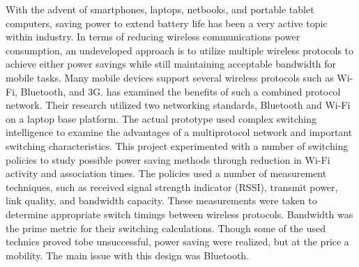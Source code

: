 \documentclass[conference]{IEEEtran}
\begin{document}
With the advent of smartphones, laptops, netbooks, and portable tablet computers, saving power to extend battery life has been a very active topic within industry. In terms of reducing wireless communications power consumption, an undeveloped approach is to utilize multiple wireless protocols to achieve either power savings while still maintaining acceptable bandwidth for mobile tasks.  Many mobile devices support several wireless protocols such as Wi-Fi, Bluetooth, and 3G.  \cite{six} has examined the benefits of such a combined protocol network.  Their research utilized two networking standards, Bluetooth and Wi-Fi on a laptop base platform.  The actual prototype used complex switching intelligence to examine the advantages of a multiprotocol network and important switching characteristics.  This project experimented with a number of switching policies to study possible power saving methods through reduction in Wi-Fi activity and association times.  The policies used a number of measurement techniques, such as received signal strength indicator (RSSI), transmit power, link quality, and bandwidth capacity.  These measurements were taken to determine appropriate switch timings between wireless protocols\cite{six}.  Bandwidth was the prime metric for their switching calculations.  Though some of the used technics proved tobe unsuccessful, power saving were realized, but at the price a mobility. The main issue with this design was Bluetooth.
\end{document}
